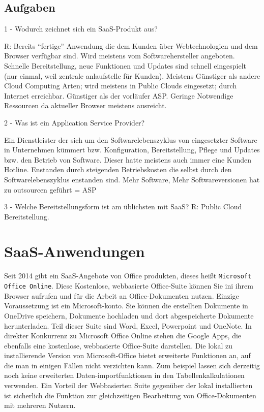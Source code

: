 \documentclass[a4paper,10pt]{article}
\begin{document}
\subsection{Aufgaben}
1 - Wodurch zeichnet sich ein SaaS-Produkt aus? \newline


R: Bereits ``fertige'' Anwendung die dem Kunden über Webtechnologien und dem Browser verfügbar sind. Wird meistens vom Softwarehersteller angeboten. Schnelle Bereitstellung, neue Funktionen und Updates sind schnell eingespielt (nur einmal, weil zentrale anlaufstelle für Kunden). Meistens Günstiger als andere Cloud Computing Arten; wird meistens in Public Clouds eingesetzt; durch Internet erreichbar. Günstiger als der vorläufer ASP. Geringe Notwendige Ressourcen da aktueller Browser meistens ausreicht.  \break


2 - Was ist ein Application Service Provider? \newline


Ein Dienstleister der sich um den Softwarelebenszyklus von eingesetzter Software in Unternehmen kümmert bzw. Konfiguration, Bereitstellung, Pflege und Updates bzw. den Betrieb von Software. Dieser hatte meistens auch immer eine Kunden Hotline. Enstanden durch steigenden Betriebskosten die selbst durch den Softwarelebenszyklus enstanden sind. Mehr Software, Mehr Softwareversionen hat zu outsourcen geführt = ASP \break


3 - Welche Bereitstellungsform ist am üblichsten mit SaaS? \newline
R: Public Cloud Bereitstellung.
\section{SaaS-Anwendungen}
Seit 2014 gibt ein SaaS-Angebote von Office produkten, dieses heißt \texttt{Microsoft Office Online}. Diese Kostenlose, webbasierte Office-Suite können Sie ini ihrem Browser aufrufen und für die Arbeit an Office-Dokumenten nutzen. Einzige Voraussetzung ist ein Microsoft-konto. Sie können die erstellten Dokumente in OneDrive speichern, Dokumente hochladen und dort abgespeicherte Dokumente herunterladen. Teil dieser Suite sind Word, Excel, Powerpoint und OneNote. In direkter Konkurrenz zu Microsoft Office Online stehen die Google Apps, die ebenfalls eine kostenlose, webbasierte Office-Suite darstellen. Die lokal zu installierende Version von Microsoft-Office bietet erweiterte Funktionen an, auf die man in einigen Fällen nicht verzichten kann. Zum beispiel lassen sich derzeitig noch keine erweiterten Daten-importfunktionen in den Tabellenkalkulationen verwenden. Ein Vorteil der Webbasierten Suite gegenüber der lokal installierten ist sicherlich die Funktion zur gleichzeitigen Bearbeitung von Office-Dokumenten mit mehreren Nutzern. \newline
\end{document}
